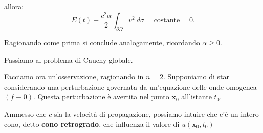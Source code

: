 \documentclass[10pt,a4paper,twoside,openright]{book}
\newcommand{\x}{\mathbf{x}}
\begin{document}
\begin{dimostrazione}
\begin{itemize}
		      allora:
		      \begin{equation*}
		      	E( t) +\frac{c^{2} \alpha }{2}\int _{\partial \Omega } v^{2} \ d\sigma =\text{costante} =0.
		      \end{equation*}
		      
		      Ragionando come prima si conclude analogamente, ricordando $\alpha \geqslant 0$.
	\end{itemize}
\end{dimostrazione}


Passiamo al problema di Cauchy globale.

Facciamo ora un'osservazione, ragionando in $n=2$. Supponiamo di star considerando una perturbazione governata da un'equazione delle onde omogenea $( f\equiv 0)$. Questa perturbazione è avertita nel punto $\x_{0}$ all'istante $t_{0}$.

Ammesso che $c$ sia la velocità di propagazione, possiamo intuire che c'è un intero cono, detto \textbf{cono retrogrado}, che influenza il valore di $u(\x_{0} ,t_{0})$

\end{document}
